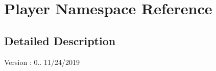 \hypertarget{namespace_player}{}\section{Player Namespace Reference}
\label{namespace_player}


\subsection{Detailed Description}
\begin{DoxyVersion}{Version}
\+: 0.. 11/24/2019 
\end{DoxyVersion}
